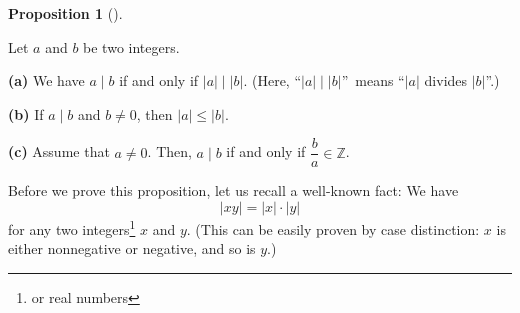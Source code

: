 \documentclass[numbers=enddot,12pt,final,onecolumn,notitlepage]{scrartcl}%
\numberwithin{exer}{subsection}
\theoremstyle{definition}
\newtheorem{prop}[theo]{Proposition}
\newenvironment{proposition}[1][]
{\begin{prop}[#1]\begin{leftbar}}
{\end{leftbar}\end{prop}}
\begin{document}
\begin{proposition}
\label{prop.ent.div.1}Let $a$ and $b$ be two integers.

\textbf{(a)} We have $a\mid b$ if and only if $\left\vert a\right\vert
\mid\left\vert b\right\vert $. (Here, \textquotedblleft$\left\vert
a\right\vert \mid\left\vert b\right\vert $\textquotedblright\ means
\textquotedblleft$\left\vert a\right\vert $ divides $\left\vert b\right\vert
$\textquotedblright.)

\textbf{(b)} If $a\mid b$ and $b\neq0$, then $\left\vert a\right\vert
\leq\left\vert b\right\vert $.

\textbf{(c)} Assume that $a\neq0$. Then, $a\mid b$ if and only if $\dfrac
{b}{a}\in\mathbb{Z}$.
\end{proposition}

Before we prove this proposition, let us recall a well-known fact: We have
\begin{equation}
\left\vert xy\right\vert =\left\vert x\right\vert \cdot\left\vert y\right\vert
\label{eq.ent.div.abs(xy)}%
\end{equation}
for any two integers\footnote{or real numbers} $x$ and $y$. (This can be
easily proven by case distinction: $x$ is either nonnegative or negative, and
so is $y$.)
\end{document}
